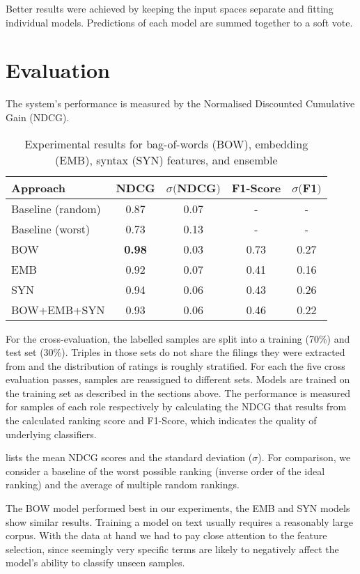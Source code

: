Better results were achieved by keeping the input spaces separate and fitting individual models.
Predictions of each model are summed together to a soft vote.

\section{Evaluation}

The system's performance is measured by the Normalised Discounted Cumulative Gain (NDCG)\cite{ir}.
\begin{table}[H]
	\caption{Experimental results for bag-of-words (BOW), embedding (EMB), syntax (SYN) features, and ensemble}
	\label{tab:results}
	\begin{tabular}{lcccc}
		\toprule
		Approach & NDCG & $\sigma ($NDCG$)$ & F1-Score &  $\sigma ($F1$)$\\
		\midrule
		Baseline (random) & 0.87 & 0.07 & - & - \\
		Baseline (worst)  & 0.73 & 0.13 & - & - \\
		\midrule
		BOW & \textbf{0.98} & 0.03 & 0.73 & 0.27\\
		EMB & 0.92 & 0.07 & 0.41 & 0.16\\
		SYN & 0.94 & 0.06 & 0.43 & 0.26 \\
		BOW+EMB+SYN& 0.93 & 0.06 & 0.46 & 0.22\\
		\bottomrule
	\end{tabular}
\end{table}
For the cross-evaluation, the labelled samples are split into a training (70\%) and test set (30\%).
Triples in those sets do not share the filings they were extracted from and the distribution of ratings is roughly stratified.
For each the five cross evaluation passes, samples are reassigned to different sets.
Models are trained on the training set as described in the sections above.
The performance is measured for samples of each role respectively by calculating the NDCG that results from the calculated ranking score and F1-Score, which indicates the quality of underlying classifiers.

 lists the mean NDCG scores and the standard deviation ($\sigma$).
For comparison, we consider a baseline of the worst possible ranking (inverse order of the ideal ranking) and the average of multiple random rankings.

The BOW model performed best in our experiments, the EMB and SYN models show similar results. 
Training a model on text usually requires a reasonably large corpus.
With the data at hand we had to pay close attention to the feature selection, since seemingly very specific terms are likely to negatively affect the model's ability to classify unseen samples.

